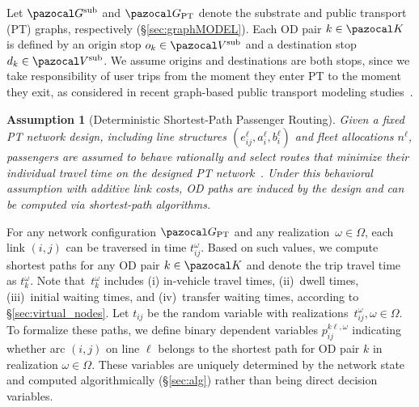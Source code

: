 \documentclass[a4paper,fleqn]{cas-sc}
\newtheorem{assumption}{Assumption}
\begin{document}
Let $\pazocal G^{\text{sub}}$ and $\pazocal G_{\text{PT}}$ denote the substrate and public transport (PT) graphs, respectively (\S\ref{sec:graphMODEL}). Each OD pair $k \in \pazocal K$ is defined by an origin stop $o_k \in \pazocal V^{\text{sub}}$ and a destination stop $d_k \in \pazocal V^{\text{sub}}$.
We assume origins and destinations are both stops, since we take responsibility of user trips from the moment they enter PT to the moment they exit, as considered in recent graph-based public transport modeling studies~\citep{zhao2024origin}.

\begin{assumption}[Deterministic Shortest-Path Passenger Routing]
\label{ass:det_routing}
Given a fixed PT network design, including line structures $(e_{ij}^\ell, a_i^\ell, b_i^\ell)$ and fleet allocations $n^\ell$, passengers are assumed to behave rationally and select routes that minimize their individual travel time on the designed PT network~\citep{goerigk2017line, schobel2022cheapest}.
Under this behavioral assumption with additive link costs, OD paths are induced by the design and can be computed via shortest-path algorithms.
\end{assumption}

For any network configuration $\pazocal G_\text{PT}$ and any realization~$\omega\in\Omega$, each link $(i,j)$ can be traversed in time $t_{ij}^\omega$. Based on such values, we compute shortest paths for any OD pair $k\in\pazocal K$ and denote the trip travel time as $t_k^\omega$. Note that~$t_k^\omega$ includes (i) in-vehicle travel times, (ii)~dwell times, (iii)~initial waiting times, and (iv)~transfer waiting times, according to \S{}\ref{sec:virtual_nodes}. Let $t_{ij}$ be the random variable with realizations~$t_{ij}^\omega,\omega\in\Omega$. 
%
%
To formalize these paths, we define binary dependent variables $p_{ij}^{k\ell,\omega}$ indicating whether arc $(i,j)$ on line $\ell$ belongs to the shortest path for OD pair $k$ in realization $\omega\in\Omega$. These variables are uniquely determined by the network state and computed algorithmically (\S\ref{sec:alg}) rather than being direct decision variables.
\end{document}
